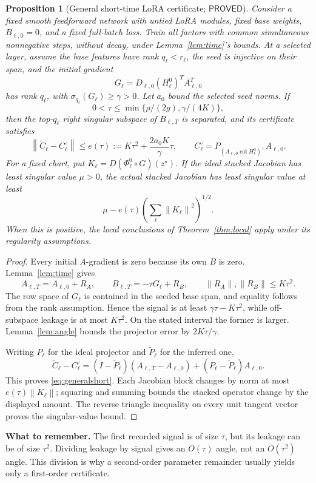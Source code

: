 \documentclass[12pt,a4paper]{article}
\theoremstyle{readable}
\newtheorem{proposition}[theorem]{Proposition}
\theoremstyle{definition}\newtheorem{example}[theorem]{Example}
\newcommand{\col}{\operatorname{col}}\newcommand{\row}{\operatorname{row}}
\newcommand{\norm}[1]{\left\|#1\right\|}
\newcommand{\PP}{\mathsf{PROVED}}\newcommand{\FF}{\mathsf{FALSE}}
\newcommand{\takeaway}[1]{\par\textbf{What to remember.} #1\par}
\begin{document}
\begin{proposition}[General short-time LoRA certificate; \(\PP\)]\label{prop:generalshort}
Consider a fixed smooth feedforward network with untied LoRA modules, fixed base weights, \(B_{\ell,0}=0\), and a fixed full-batch loss. Train all factors with common simultaneous nonnegative steps, without decay, under Lemma~\ref{lem:time}'s bounds. At a selected layer, assume the base features have rank \(q_\ell<r_\ell\), the seed is injective on their span, and the initial gradient
\[
G_\ell=D_{\ell,0}(H_\ell^0)^TA_{\ell,0}^T
\]
has rank \(q_\ell\), with \(\sigma_{q_\ell}(G_\ell)\ge\gamma>0\). Let \(a_0\) bound the selected seed norms. If
\[
0<\tau\le\min\{\rho/(2g),\gamma/(4K)\},
\]
then the top-\(q_\ell\) right singular subspace of \(B_{\ell,T}\) is separated, and its certificate satisfies
\begin{equation}\label{eq:generalshort}
\norm{\widetilde C_\ell-C_\ell^\circ}
\le e(\tau):=K\tau^2+\frac{2a_0K}{\gamma}\tau,
\qquad
C_\ell^\circ=P_{(A_{\ell,0}\col H_\ell^0)^\perp}A_{\ell,0}.
\end{equation}
For a fixed chart, put \(K_\ell=D(\Phi_\ell^0\circ G)(z^\star)\). If the ideal stacked Jacobian has least singular value \(\mu>0\), the actual stacked Jacobian has least singular value at least
\[
\mu-e(\tau)\left(\sum_\ell\norm{K_\ell}^2\right)^{1/2}.
\]
When this is positive, the local conclusions of Theorem~\ref{thm:local} apply under its regularity assumptions.
\end{proposition}
\begin{proof}
Every initial \(A\)-gradient is zero because its own \(B\) is zero. Lemma~\ref{lem:time} gives
\[
A_{\ell,T}=A_{\ell,0}+R_A,\qquad
B_{\ell,T}=-\tau G_\ell+R_B,\qquad
\norm{R_A},\norm{R_B}\le K\tau^2.
\]
The row space of \(G_\ell\) is contained in the seeded base span, and equality follows from the rank assumption. Hence the signal is at least \(\gamma\tau-K\tau^2\), while off-subspace leakage is at most \(K\tau^2\). On the stated interval the former is larger. Lemma~\ref{lem:angle} bounds the projector error by \(2K\tau/\gamma\).

Writing \(P_\ell\) for the ideal projector and \(\widetilde P_\ell\) for the inferred one,
\[
\widetilde C_\ell-C_\ell^\circ
=(I-\widetilde P_\ell)(A_{\ell,T}-A_{\ell,0})
+(P_\ell-\widetilde P_\ell)A_{\ell,0}.
\]
This proves \eqref{eq:generalshort}. Each Jacobian block changes by norm at most \(e(\tau)\norm{K_\ell}\); squaring and summing bounds the stacked operator change by the displayed amount. The reverse triangle inequality on every unit tangent vector proves the singular-value bound.
\end{proof}
\takeaway{The first recorded signal is of size \(\tau\), but its leakage can be of size \(\tau^2\). Dividing leakage by signal gives an \(O(\tau)\) angle, not an \(O(\tau^2)\) angle. This division is why a second-order parameter remainder usually yields only a first-order certificate.}
\end{document}
